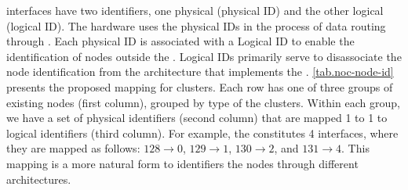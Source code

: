 
			\noc interfaces have two identifiers, one physical (physical ID) and the
			other logical (logical ID). The hardware uses the physical IDs in the
			process of data routing through \noc. Each physical ID is associated with
			a Logical ID to enable the identification of \noc nodes outside the \hal.
			Logical IDs primarily serve to disassociate the node identification from
			the architecture that implements the \hal. \autoref{tab.noc-node-id}
			presents the proposed mapping for \mppa clusters. Each row has one of
			three groups of existing \noc nodes (first column), grouped by type of
			the clusters. Within each group, we have a set of physical identifiers
			(second column) that are mapped 1 to 1 to logical identifiers (third column).
			For example, the  constitutes 4 \noc interfaces, where they are
			mapped as follows: $128 \to 0$, $129 \to 1$, $130 \to 2$, and $131 \to 4$.
			This mapping is a more natural form to identifiers the \noc nodes through
			different architectures.

